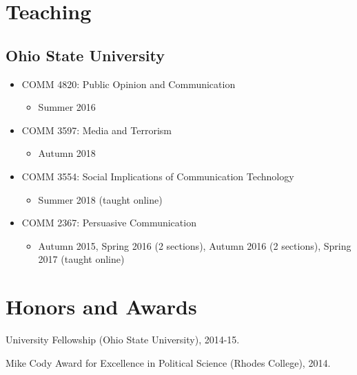 \documentclass[letterpaper,MMMyyyy,nonstopmode]{simplecv}
\def\tightlist{} %
\begin{document}
\begin{Body}
\hypertarget{teaching}{%
\section{Teaching}\label{teaching}}

\hypertarget{ohio-state-university}{%
\subsection{Ohio State University}\label{ohio-state-university}}

\begin{itemize}
\tightlist
\item
  COMM 4820: Public Opinion and Communication

  \begin{itemize}
  \tightlist
  \item
    Summer 2016
  \end{itemize}
\item
  COMM 3597: Media and Terrorism

  \begin{itemize}
  \tightlist
  \item
    Autumn 2018
  \end{itemize}
\item
  COMM 3554: Social Implications of Communication Technology

  \begin{itemize}
  \tightlist
  \item
    Summer 2018 (taught online)
  \end{itemize}
\item
  COMM 2367: Persuasive Communication

  \begin{itemize}
  \tightlist
  \item
    Autumn 2015, Spring 2016 (2 sections), Autumn 2016 (2 sections),
    Spring 2017 (taught online)
  \end{itemize}
\end{itemize}

\hypertarget{honors-and-awards}{%
\section{Honors and Awards}\label{honors-and-awards}}

University Fellowship (Ohio State University), 2014-15.

Mike Cody Award for Excellence in Political Science (Rhodes College),
2014.


\end{Body}
\end{document}
